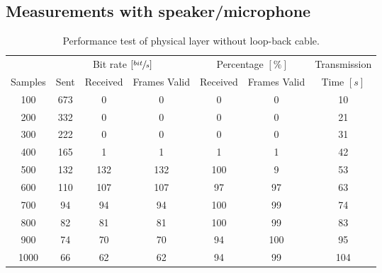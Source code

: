 	\subsection{Measurements with speaker/microphone}
	\begin{table}[!h]
		\begin{center}
			\begin{tabular}{c|c c c|c c|c}
			& \multicolumn{3}{|c|}{Bit rate $[\sfrac{bit}{s}]$} & \multicolumn{2}{c|}{Percentage $[\%]$} & Transmission \\
			Samples & Sent & Received & Frames Valid & Received & Frames Valid & Time $[s]$\\
			\hline
			100 & 673 & 0 & 0 & 0 & 0 & 10 \\
			200 & 332 & 0 & 0 & 0 & 0 & 21 \\
			300 & 222 & 0 & 0 & 0 & 0 & 31 \\
			400 & 165 & 1 & 1 & 1 & 1 & 42 \\
			500 & 132 & 132 & 132 & 100 & 9 & 53 \\
			600 & 110 & 107 & 107 & 97 & 97 & 63 \\
			700 & 94 & 94 & 94 & 100 & 99 & 74 \\
			800 & 82 & 81 & 81 & 100 & 99 & 83 \\
			900 & 74 & 70 & 70 & 94 & 100 & 95 \\
			1000 & 66 & 62 & 62 & 94 & 99 & 104 \\
			\end{tabular}
		\end{center}
		\caption{Performance test of physical layer without loop-back cable.}
		\label{tab:exp_phys_speaker}
	\end{table}